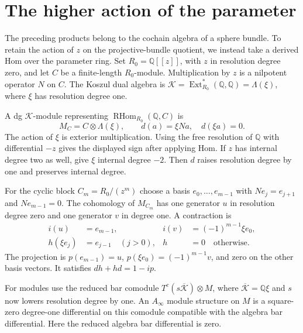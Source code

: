 \section{The higher action of the parameter}
\label{df:sec:parameter}

The preceding products belong to the cochain algebra of a sphere bundle.
To retain the action of $z$ on the projective-bundle quotient, we instead
take a derived Hom over the parameter ring. Set $R_0=\mathbb Q[[z]]$,
with $z$ in resolution degree zero, and let $C$ be a finite-length
$R_0$-module. Multiplication by $z$ is a nilpotent operator $N$ on $C$.
The Koszul dual algebra is
$\mathcal K=\operatorname{Ext}_{R_0}^*(\mathbb Q,\mathbb Q)
=\Lambda(\xi)$, where $\xi$ has resolution degree one.

A dg $\mathcal K$-module representing
$\operatorname{RHom}_{R_0}(\mathbb Q,C)$ is
\begin{equation}\label{df:eq:parameter-module}
 M_C=C\otimes\Lambda(\xi),\qquad
 d(a)=\xi Na,\quad d(\xi a)=0.
\end{equation}
The action of $\xi$ is exterior multiplication. Using the free resolution
of $\mathbb Q$ with differential $-z$ gives the displayed sign after
applying Hom. If $z$ has internal degree two as well, give $\xi$ internal
degree $-2$. Then $d$ raises resolution degree by one and preserves
internal degree.

For the cyclic block $C_m=R_0/(z^m)$ choose a basis
$e_0,\ldots,e_{m-1}$ with $Ne_j=e_{j+1}$ and $Ne_{m-1}=0$.
The cohomology of $M_{C_m}$ has one generator $u$ in resolution degree
zero and one generator $v$ in degree one. A contraction is
\begin{equation}\label{df:eq:block-contraction}
 \begin{aligned}
 i(u)&=e_{m-1},& i(v)&=(-1)^{m-1}\xi e_0,\\
 h(\xi e_j)&=e_{j-1}\quad(j>0),& h&=0\quad\text{otherwise}.
 \end{aligned}
\end{equation}
The projection is $p(e_{m-1})=u$, $p(\xi e_0)=(-1)^{m-1}v$,
and zero on the other basis vectors. It satisfies $dh+hd=1-ip$.

For modules use the reduced bar comodule
$T^c(s\overline{\mathcal K})\otimes M$, where
$\overline{\mathcal K}=\mathbb Q\xi$ and $s$ now lowers resolution
degree by one. An $A_\infty$ module structure on $M$ is a square-zero degree-one
differential on this comodule compatible with the algebra bar
differential. Here the reduced algebra bar differential is zero.

